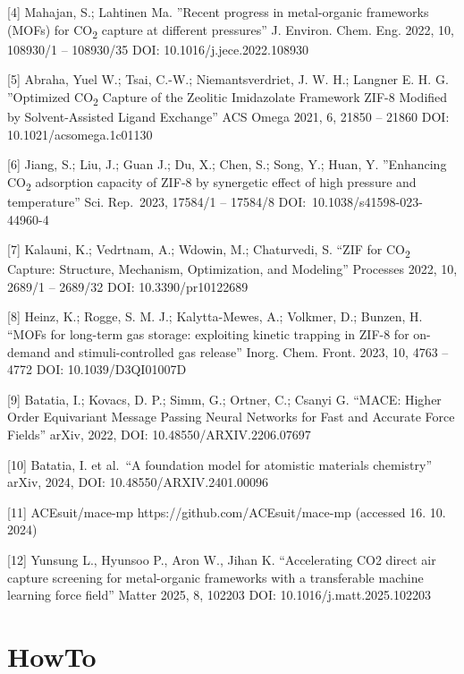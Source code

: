 \documentclass[
  letterpaper,
]{article}
\begin{document}
{[}4{]} Mahajan, S.; Lahtinen Ma. ''Recent progress in metal-organic
frameworks (MOFs) for CO\textsubscript{2} capture at different
pressures'' J. Environ. Chem. Eng. 2022, 10, 108930/1 -- 108930/35 DOI:
10.1016/j.jece.2022.108930

{[}5{]} Abraha, Yuel W.; Tsai, C.-W.; Niemantsverdriet, J. W. H.;
Langner E. H. G. ''Optimized CO\textsubscript{2} Capture of the Zeolitic
Imidazolate Framework ZIF-8 Modified by Solvent-Assisted Ligand
Exchange'' ACS Omega 2021, 6, 21850 -- 21860 DOI:
10.1021/acsomega.1c01130

{[}6{]} Jiang, S.; Liu, J.; Guan J.; Du, X.; Chen, S.; Song, Y.; Huan,
Y. ''Enhancing CO\textsubscript{2} adsorption capacity of ZIF‑8 by
synergetic effect of high pressure and temperature'' Sci. Rep.~2023,
17584/1 -- 17584/8 DOI:~10.1038/s41598-023-44960-4

{[}7{]} Kalauni, K.; Vedrtnam, A.; Wdowin, M.; Chaturvedi, S. ``ZIF for
CO\textsubscript{2} Capture: Structure, Mechanism, Optimization, and
Modeling'' Processes 2022, 10, 2689/1 -- 2689/32 DOI: 10.3390/pr10122689

{[}8{]} Heinz, K.; Rogge, S. M. J.; Kalytta-Mewes, A.; Volkmer, D.;
Bunzen, H. ``MOFs for long-term gas storage: exploiting kinetic trapping
in ZIF-8 for on-demand and stimuli-controlled gas release'' Inorg. Chem.
Front. 2023, 10, 4763 -- 4772 DOI: 10.1039/D3QI01007D

{[}9{]} Batatia, I.; Kovacs, D. P.; Simm, G.; Ortner, C.; Csanyi G.
``MACE: Higher Order Equivariant Message Passing Neural Networks for
Fast and Accurate Force Fields'' arXiv, 2022, DOI:
10.48550/ARXIV.2206.07697

{[}10{]} Batatia, I. et al.~``A foundation model for atomistic materials
chemistry'' arXiv, 2024, DOI: 10.48550/ARXIV.2401.00096

{[}11{]} ACEsuit/mace-mp https://github.com/ACEsuit/mace-mp (accessed
16. 10. 2024)

{[}12{]} Yunsung L., Hyunsoo P., Aron W., Jihan K. ``Accelerating CO2
direct air capture screening for metal-organic frameworks with a
transferable machine learning force field'' Matter 2025, 8, 102203 DOI:
10.1016/j.matt.2025.102203

\hypertarget{howto-2}{%
\section{HowTo}\label{howto-2}}
\end{document}
